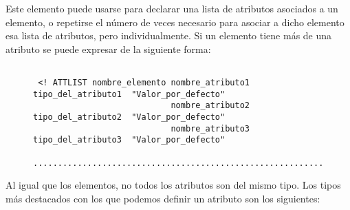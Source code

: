Este elemento puede usarse para declarar una lista de atributos asociados a un elemento, o repetirse el número de veces necesario para asociar a dicho elemento esa lista de atributos, pero individualmente. Si un elemento tiene más de una atributo se puede expresar de la siguiente forma:

    \begin{figure}[H]
    \begin{tcolorbox}[sharp corners, colback=yellow!30, colframe=white!20]
        \scriptsize
        \begin{verbatim}

 <! ATTLIST nombre_elemento nombre_atributo1  tipo_del_atributo1  "Valor_por_defecto"
                            nombre_atributo2  tipo_del_atributo2  "Valor_por_defecto"
                            nombre_atributo3  tipo_del_atributo3  "Valor_por_defecto"
            ........................................................................>
        \end{verbatim}
    \end{tcolorbox}
\end{figure}

Al igual que los elementos, no todos los atributos son del mismo tipo. Los tipos más destacados con los que podemos definir un atributo son los siguientes:

